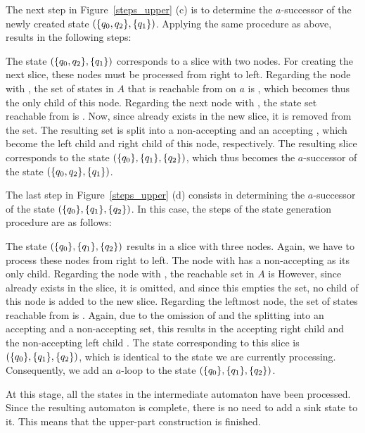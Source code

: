 The next step in Figure~\ref{steps_upper} (c) is to determine the $a$-successor of the newly created state $(\{q_{0},q_{2}\}, \{q_{1}\})$. Applying the same procedure as above, results in the following steps:

\begin{center}
\SlicesTwo
\end{center}

The state $(\{q_{0},q_{2}\}, \{q_{1}\})$ corresponds to a slice with two nodes. For creating the next slice, these nodes must be processed from right to left. Regarding the node with , the set of states in $A$ that is reachable from  on $a$ is , which becomes thus the only child of this node. Regarding the next node with , the state set reachable from  is . Now, since  already exists in the new slice, it is removed from the set. The resulting set  is split into a non-accepting  and an accepting , which become the left child and right child of this node, respectively. The resulting slice corresponds to the state $(\{q_{0}\}, \{q_{1}\}, \{q_{2}\})$, which thus becomes the $a$-successor of the state $(\{q_{0},q_{2}\}, \{q_{1}\})$.

The last step in Figure~\ref{steps_upper} (d) consists in determining the $a$-successor of the state $(\{q_{0}\}, \{q_{1}\}, \{q_{2}\})$. In this case, the steps of the state generation procedure are as follows:

\begin{center}
\SlicesThree
\end{center}

The state $(\{q_{0}\}, \{q_{1}\}, \{q_{2}\})$ results in a slice with three nodes. Again, we have to process these nodes from right to left. The node with  has a non-accepting  as its only child. Regarding the node with , the reachable set in $A$ is  However, since  already exists in the slice, it is omitted, and since this empties the set, no child of this node is added to the new slice. Regarding the leftmost node, the set of states reachable from  is . Again, due to the omission of  and the splitting into an accepting and a non-accepting set, this results in the accepting right child  and the non-accepting left child . The state corresponding to this slice is $(\{q_{0}\}, \{q_{1}\}, \{q_{2}\})$, which is identical to the state we are currently processing. Consequently, we add an $a$-loop to the state $(\{q_{0}\}, \{q_{1}\}, \{q_{2}\})$.

At this stage, all the states in the intermediate automaton have been processed. Since the resulting automaton is complete, there is no need to add a sink state to it. This means that the upper-part construction is finished.

